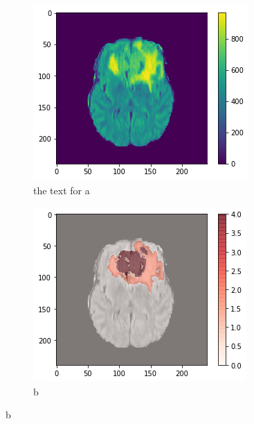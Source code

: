 \begin{figure}[H]
    \centering
    \begin{subfigure}{.33\textwidth}
        \centering
        \includegraphics[width=\linewidth]{chapters/07_brats3d/images/04_flair.png}
        \caption{ the text for a}
    \end{subfigure}%
    \begin{subfigure}{.33\textwidth}
        \centering
        \includegraphics[width=\linewidth]{chapters/07_brats3d/images/08_flair_segment.png}
        \caption{b}
    \end{subfigure}

\end{figure}
